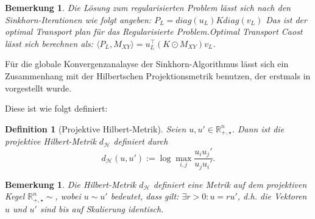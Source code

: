 \documentclass[11pt,a4paper]{article}
\newtheorem{definition}[theorem]{Definition}
\newtheorem{remark}[theorem]{Bemerkung}
\numberwithin{equation}{section}
\begin{document}
	
	

	
	
	
	\begin{remark}
		Die Lösung zum regularisierten Problem lässt sich nach den Sinkhorn-Iterationen wie folgt angeben: $P_L = diag(u_L)K diag(v_L)$ Das ist  der optimal Transport plan für das Regularisierte Problem.Optimal Transport Caost lässt sich berechnen als:
		$\langle P_L, M_{XY}\rangle = u_L ^\top ( K \odot M_{XY})v_L$.	\end{remark}	
	
	
	Für die globale Konvergenzanalayse der Sinkhorn-Algorithmus lässt sich ein Zusammenhang mit der Hilbertschen Projektionsmetrik benutzen, der erstmals in \cite{franklin_sinkhorn_convergence} vorgestellt wurde.
	
	Diese ist wie folgt definiert:
	
	\begin{definition}[Projektive Hilbert-Metrik]
		Seien $u,u' \in \mathbb{R}_{+,\star}^n$.
		Dann ist die projektive Hilbert-Metrik $d_\mathcal{H}$ definiert durch
		\begin{equation}
		d_\mathcal{H}(u,u') := \log \max_{i,j}{\frac{u_iu_j'}{u_ju_i'}}.
		\end{equation}
	\end{definition}
	
	\begin{remark}
		Die Hilbert-Metrik $ d_\mathcal{H}$ definiert eine Metrik auf dem projektiven Kegel $\mathbb{R}_{+, \star}^n \sim$, wobei $u \sim u'$ bedeutet, dass gilt: $\exists r >0:u=ru'$, d.h. die Vektoren $u$ und $u'$ sind bis auf Skalierung identisch.
		
	\end{remark}
	

\end{document}

